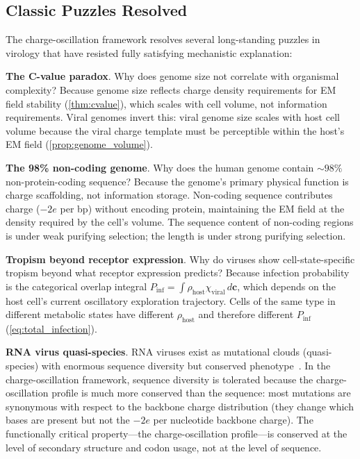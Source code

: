 \documentclass[11pt,twocolumn,a4paper]{article}
\theoremstyle{definition}
\theoremstyle{remark}
\newcommand{\Phost}{\rho_{\mathrm{host}}}
\newcommand{\chiviral}{\chi_{\mathrm{viral}}}
\newcommand{\vv}[1]{\boldsymbol{#1}}
\begin{document}
\subsection{Classic Puzzles Resolved}

The charge-oscillation framework resolves several long-standing puzzles in virology that have resisted fully satisfying mechanistic explanation:

\textbf{The C-value paradox}. Why does genome size not correlate with organismal complexity? Because genome size reflects charge density requirements for EM field stability (\cref{thm:cvalue}), which scales with cell volume, not information requirements. Viral genomes invert this: viral genome size scales with host cell volume because the viral charge template must be perceptible within the host's EM field (\cref{prop:genome_volume}).

\textbf{The 98\% non-coding genome}. Why does the human genome contain $\sim\!98\%$ non-protein-coding sequence? Because the genome's primary physical function is charge scaffolding, not information storage. Non-coding sequence contributes charge ($-2e$ per bp) without encoding protein, maintaining the EM field at the density required by the cell's volume. The sequence content of non-coding regions is under weak purifying selection; the length is under strong purifying selection.

\textbf{Tropism beyond receptor expression}. Why do viruses show cell-state-specific tropism beyond what receptor expression predicts? Because infection probability is the categorical overlap integral $P_{\mathrm{inf}} = \int \Phost \chiviral\,d\vv{c}$, which depends on the host cell's current oscillatory exploration trajectory. Cells of the same type in different metabolic states have different $\Phost$ and therefore different $P_{\mathrm{inf}}$ (\cref{eq:total_infection}).

\textbf{RNA virus quasi-species}. RNA viruses exist as mutational clouds (quasi-species) with enormous sequence diversity but conserved phenotype~\cite{Domingo2012}. In the charge-oscillation framework, sequence diversity is tolerated because the charge-oscillation profile is much more conserved than the sequence: most mutations are synonymous with respect to the backbone charge distribution (they change which bases are present but not the $-2e$ per nucleotide backbone charge). The functionally critical property---the charge-oscillation profile---is conserved at the level of secondary structure and codon usage, not at the level of sequence.
\end{document}
